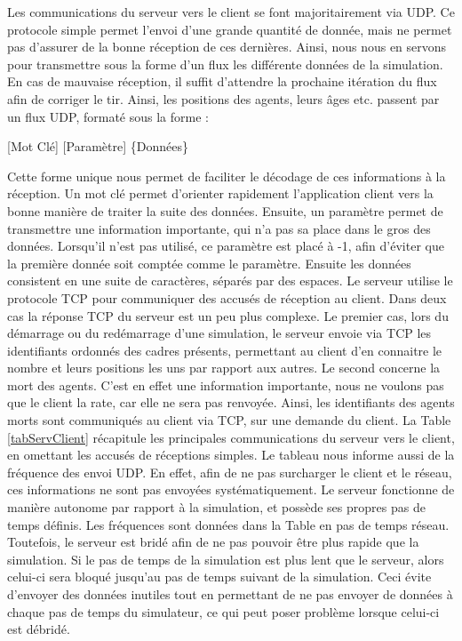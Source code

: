 	Les communications du serveur vers le client se font majoritairement via UDP. Ce protocole simple permet l'envoi d'une grande quantité de donnée, mais ne permet pas d'assurer de la bonne réception de ces dernières. Ainsi, nous nous en servons pour transmettre sous la forme d'un flux les différente données de la simulation. En cas de mauvaise réception, il suffit d'attendre la prochaine itération du flux afin de corriger le tir. Ainsi, les positions des agents, leurs âges etc. passent par un flux UDP, formaté sous la forme :	
	\begin{center}
		[Mot Clé] [Paramètre] \{Données\}
	\end{center}
	Cette forme unique nous permet de faciliter le décodage de ces informations à la réception. Un mot clé permet d'orienter rapidement l'application client vers la bonne manière de traiter la suite des données. Ensuite, un paramètre permet de transmettre une information importante, qui n'a pas sa place dans le gros des données. Lorsqu'il n'est pas utilisé, ce paramètre est placé à -1, afin d'éviter que la première donnée soit comptée comme le paramètre. Ensuite les données consistent en une suite de caractères, séparés par des espaces. 
	Le serveur utilise le protocole TCP pour communiquer des accusés de réception au client. Dans deux cas la réponse TCP du serveur est un peu plus complexe. Le premier cas, lors du démarrage ou du redémarrage d'une simulation, le serveur envoie via TCP les identifiants ordonnés des cadres présents, permettant au client d'en connaitre le nombre et leurs positions les uns par rapport aux autres. Le second concerne la mort des agents. C'est en effet une information importante, nous ne voulons pas que le client la rate, car elle ne sera pas renvoyée. Ainsi, les identifiants des agents morts sont communiqués au client via TCP, sur une demande du client. 
	La Table \ref{tabServClient} récapitule les principales communications du serveur vers le client, en omettant les accusés de réceptions simples. Le tableau nous informe aussi de la fréquence des envoi UDP. En effet, afin de ne pas surcharger le client et le réseau, ces informations ne sont pas envoyées systématiquement. Le serveur fonctionne de manière autonome par rapport à la simulation, et possède ses propres pas de temps définis. Les fréquences sont données dans la Table en pas de temps réseau. 
	Toutefois, le serveur est bridé afin de ne pas pouvoir être plus rapide que la simulation. Si le pas de temps de la simulation est plus lent que le serveur, alors celui-ci sera bloqué jusqu'au pas de temps suivant de la simulation. Ceci évite d'envoyer des données inutiles tout en permettant de ne pas envoyer de données à chaque pas de temps du simulateur, ce qui peut poser problème lorsque celui-ci est débridé.
	
